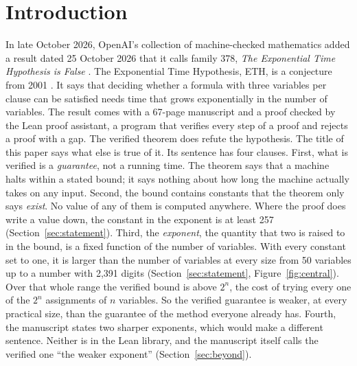 \section{Introduction}
\label{sec:intro}

In late October 2026, OpenAI's collection of machine-checked mathematics
added a result dated 25 October 2026 that it calls family 378,
\emph{The Exponential Time Hypothesis is False}
\citep{OAI:The-Exponential-Time-Hypothesis-is-False-October-25-2026}.
The Exponential Time Hypothesis, ETH, is a conjecture from 2001
\citep{ImpagliazzoPaturi2001}. It says that deciding whether a formula
with three variables per clause can be satisfied needs time that grows
exponentially in the number of variables. The result comes with a
67-page manuscript and a proof checked by the Lean proof assistant, a
program that verifies every step of a proof and rejects a proof with a
gap. The verified theorem does refute the hypothesis. The title of this
paper says what else is true of it. Its sentence has four clauses.
First, what is verified is a \emph{guarantee}, not a running time. The
theorem says that a machine halts within a stated bound; it says
nothing about how long the machine actually takes on any input. Second,
the bound contains constants that the theorem only says \emph{exist}.
No value of any of them is computed anywhere. Where the proof does
write a value down, the constant in the exponent is at least 257
(Section~\ref{sec:statement}). Third, the \emph{exponent}, the quantity
that two is raised to in the bound, is a fixed function of the number
of variables. With every constant set to one, it is larger than the
number of variables at every size from 50 variables up to a number with
2,391 digits (Section~\ref{sec:statement}, Figure~\ref{fig:central}).
Over that whole range the verified bound is above $2^n$, the cost of
trying every one of the $2^n$ assignments of $n$ variables. So the
verified guarantee is weaker, at every practical size, than the
guarantee of the method everyone already has. Fourth, the manuscript
states two sharper exponents, which would make a different sentence.
Neither is in the Lean library, and the manuscript itself calls the
verified one ``the weaker exponent'' (Section~\ref{sec:beyond}).

